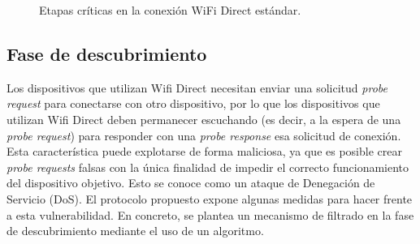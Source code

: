 \documentclass[conference,a4paper,onecolumn,11pt]{IEEEtran} %
\begin{document}
\begin{figure}[htbp]
\caption{Etapas críticas en la conexión WiFi Direct estándar.}
\label{fig:diagrama_fases_redux}
\end{figure}

\subsection{Fase de descubrimiento}
Los dispositivos que utilizan Wifi Direct necesitan enviar una solicitud \textit{probe request} para conectarse con otro dispositivo, por lo que los dispositivos que utilizan Wifi Direct deben permanecer escuchando (es decir, a la espera de una \textit{probe request}) para responder con una \textit{probe response} esa solicitud de conexión.
Esta característica puede explotarse de forma maliciosa, ya que es posible crear \textit{probe requests} falsas con la única finalidad de impedir el correcto funcionamiento del dispositivo objetivo. Esto se conoce como un ataque de Denegación de Servicio (DoS).
El protocolo propuesto expone algunas medidas para hacer frente a esta vulnerabilidad. En concreto, se plantea un mecanismo de filtrado en la fase de descubrimiento mediante el uso de un algoritmo.
\end{document}
